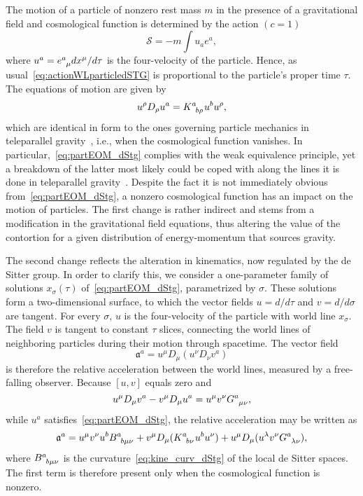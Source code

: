 \documentclass[%
5p,
times,
sort&compress
]{elsarticle}
\newcommand{\ind}{\indices}
\def\mf{\mathfrak}
\def\mc{\mathcal}
\begin{document}
The motion of a particle of nonzero rest mass $m$ in the presence 
of a gravitational field and cosmological function is determined 
by the action $(c = 1)$
\begin{equation}
\label{eq:actionWLparticledSTG}
  \mc{S} = -m \int u_a e^a,
\end{equation}
where $u^a = e\ind{^a_\mu} dx^\mu/d\tau$ is the four-velocity of 
the particle. Hence, as usual~\eqref{eq:actionWLparticledSTG} is 
proportional to the particle's proper time $\tau$. The equations 
of motion are given by
\begin{equation}
\label{eq:partEOM_dStg}
  u^\rho D_\rho u^a = K\ind{^a_{b\rho}} u^b u^\rho,
\end{equation}
which are identical in form to the ones governing particle 
mechanics in teleparallel gravity~\cite{deAndrade:1997qt}, i.e., 
when the cosmological function vanishes. In 
particular,~\eqref{eq:partEOM_dStg} complies with the weak 
equivalence principle, yet a breakdown of the latter most likely 
could be coped with along the lines it is done in teleparallel 
gravity~\cite{Aldrovandi:2003pa}. Despite the fact it is not 
immediately obvious from~\eqref{eq:partEOM_dStg}, a nonzero 
cosmological function has an impact on the motion of particles.  
The first change is rather indirect and stems from a modification 
in the gravitational field equations, thus altering the value of 
the contortion for a given distribution of energy-momentum that 
sources gravity. 

The second change reflects the alteration in kinematics, now 
regulated by the de Sitter group. In order to clarify this, we 
consider a one-parameter family of solutions $x_\sigma(\tau)$ 
of~\eqref{eq:partEOM_dStg}, pa\-ram\-e\-trized by $\sigma$.  
These solutions form a two-dimensional surface, to which the 
vector fields $u = d/d\tau$ and $v = d/d\sigma$ are tangent. For 
every $\sigma$, $u$ is the four-velocity of the particle with 
world line $x_\sigma$. The field $v$ is tangent to constant 
$\tau$ slices, connecting the world lines of neighboring 
particles during their motion through spacetime. The vector 
field~\cite{carroll:sg}
\begin{equation*}
  \mf{a}^a = u^\mu D_\mu (u^\nu D_\nu v^a)
\end{equation*}
is therefore the relative acceleration between the world lines, 
measured by a free-falling observer. Because $[u,v]$ equals zero 
and
\begin{equation*}
u^\mu D_\mu v^a - v^\mu D_\mu u^a = u^\mu v^\nu 
G\ind{^a_{\mu\nu}},
\end{equation*}
while $u^a$ satisfies~\eqref{eq:partEOM_dStg}, the relative 
acceleration may be written as
\begin{equation}
\label{eq:rel_acc_dStg}
  \mf{a}^a = u^\mu v^\nu u^b B\ind{^a_{b\mu\nu}}
  + v^\mu D_\mu (K\ind{^a_{b\nu}} u^b u^\nu) + u^\mu D_\mu 
  (u^\lambda v^\nu G\ind{^a_{\lambda\nu}}),
\end{equation}
where $B\ind{^a_{b\mu\nu}}$ is the
curvature~\eqref{eq:kine_curv_dStg} of the local de Sitter 
spaces. The first term is therefore present only when the 
cosmological function is nonzero.
\end{document}

